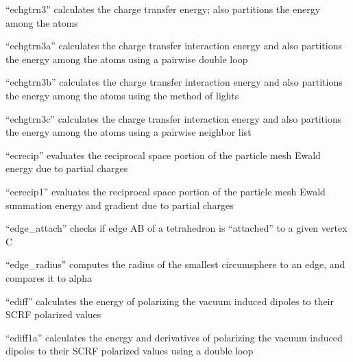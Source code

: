 \documentclass[letterpaper,11pt,english]{sphinxmanual}
\begin{document}
\sphinxAtStartPar
{}

\sphinxAtStartPar
“echgtrn3” calculates the charge transfer energy; also partitions the energy among the atoms

\sphinxAtStartPar
{}

\sphinxAtStartPar
“echgtrn3a” calculates the charge transfer interaction energy and also partitions the energy among the atoms using a pairwise double loop

\sphinxAtStartPar
{}

\sphinxAtStartPar
“echgtrn3b” calculates the charge transfer interaction energy and also partitions the energy among the atoms using the method of lights

\sphinxAtStartPar
{}

\sphinxAtStartPar
“echgtrn3c” calculates the charge transfer interaction energy and also partitions the energy among the atoms using a pairwise neighbor list

\sphinxAtStartPar
{}

\sphinxAtStartPar
“ecrecip” evaluates the reciprocal space portion of the particle mesh Ewald energy due to partial charges

\sphinxAtStartPar
{}

\sphinxAtStartPar
“ecrecip1” evaluates the reciprocal space portion of the particle mesh Ewald summation energy and gradient due to partial charges

\sphinxAtStartPar
{}

\sphinxAtStartPar
“edge\_attach” checks if edge AB of a tetrahedron is “attached” to a given vertex C

\sphinxAtStartPar
{}

\sphinxAtStartPar
“edge\_radius” computes the radius of the smallest circumsphere to an edge, and compares it to alpha

\sphinxAtStartPar
{}

\sphinxAtStartPar
“ediff” calculates the energy of polarizing the vacuum induced dipoles to their SCRF polarized values

\sphinxAtStartPar
{}

\sphinxAtStartPar
“ediff1a” calculates the energy and derivatives of polarizing the vacuum induced dipoles to their SCRF polarized values using a double loop
\end{document}
